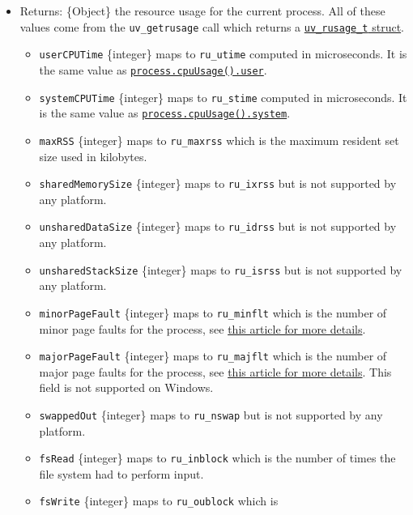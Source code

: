 \begin{itemize}
\tightlist
\item
  Returns: \{Object\} the resource usage for the current process. All of
  these values come from the \texttt{uv\_getrusage} call which returns a
  \href{https://docs.libuv.org/en/v1.x/misc.html\#c.uv_rusage_t}{\texttt{uv\_rusage\_t}
  struct}.

  \begin{itemize}
  \tightlist
  \item
    \texttt{userCPUTime} \{integer\} maps to \texttt{ru\_utime} computed
    in microseconds. It is the same value as
    \hyperref[processcpuusagepreviousvalue]{\texttt{process.cpuUsage().user}}.
  \item
    \texttt{systemCPUTime} \{integer\} maps to \texttt{ru\_stime}
    computed in microseconds. It is the same value as
    \hyperref[processcpuusagepreviousvalue]{\texttt{process.cpuUsage().system}}.
  \item
    \texttt{maxRSS} \{integer\} maps to \texttt{ru\_maxrss} which is the
    maximum resident set size used in kilobytes.
  \item
    \texttt{sharedMemorySize} \{integer\} maps to \texttt{ru\_ixrss} but
    is not supported by any platform.
  \item
    \texttt{unsharedDataSize} \{integer\} maps to \texttt{ru\_idrss} but
    is not supported by any platform.
  \item
    \texttt{unsharedStackSize} \{integer\} maps to \texttt{ru\_isrss}
    but is not supported by any platform.
  \item
    \texttt{minorPageFault} \{integer\} maps to \texttt{ru\_minflt}
    which is the number of minor page faults for the process, see
    \href{https://en.wikipedia.org/wiki/Page_fault\#Minor}{this article
    for more details}.
  \item
    \texttt{majorPageFault} \{integer\} maps to \texttt{ru\_majflt}
    which is the number of major page faults for the process, see
    \href{https://en.wikipedia.org/wiki/Page_fault\#Major}{this article
    for more details}. This field is not supported on Windows.
  \item
    \texttt{swappedOut} \{integer\} maps to \texttt{ru\_nswap} but is
    not supported by any platform.
  \item
    \texttt{fsRead} \{integer\} maps to \texttt{ru\_inblock} which is
    the number of times the file system had to perform input.
  \item
    \texttt{fsWrite} \{integer\} maps to \texttt{ru\_oublock} which is

\end{itemize}
\end{itemize}
